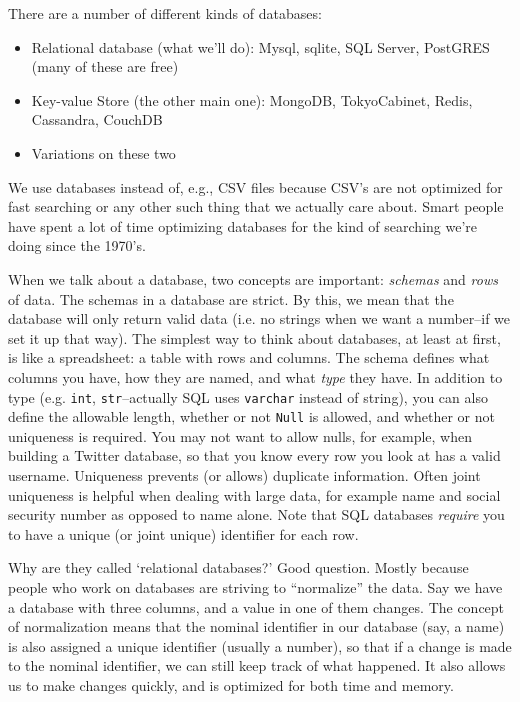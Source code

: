\documentclass[12pt,letter]{article}
\begin{document}
There are a number of different kinds of databases:
\begin{itemize}
\item Relational database (what we'll do): Mysql, sqlite, SQL Server,
  PostGRES (many of these are free) 
\item Key-value Store (the other main one): MongoDB, TokyoCabinet,
  Redis, Cassandra, CouchDB
\item Variations on these two 
\end{itemize}

We use databases instead of, e.g., CSV files because CSV's are not
optimized for fast searching or any other such thing that we
actually care about. Smart people have spent a lot of time optimizing databases
for the kind of searching we're doing since the 1970's. 

When we talk about a database, two concepts are important:
\emph{schemas} and \emph{rows} of data. The schemas in a database are
strict. By this, we mean that the database will only return valid data
(i.e. no strings when we want a number--if we set it up that way). The
simplest way to think about databases, at least at first, is like a
spreadsheet: a table with rows and columns. The schema defines what
columns you have, how they are named, and what \emph{type} they
have. In addition to type (e.g. \texttt{int}, \texttt{str}--actually
SQL uses \texttt{varchar} instead of string), you can
also define the allowable length, whether or not \texttt{Null} is
allowed, and whether or not uniqueness is required. You may not want to allow nulls, for example, when building a
Twitter database, so that you know every row you look at has a valid
username. Uniqueness prevents (or allows) duplicate information. Often
joint uniqueness is helpful when dealing with large data, for example
name and social security number as opposed to name alone. Note that
SQL databases \emph{require} you to have a unique (or joint unique)
identifier for each row. 

Why are they called `relational databases?' Good question. Mostly
because people who work on databases are striving to ``normalize'' the
data. Say we have a database with three columns, and a value in one of
them changes. The concept of normalization means that the nominal
identifier in our database (say, a name) is also assigned a unique
identifier (usually a number), so that if a change is made to the
nominal identifier, we can still keep track of what happened. It also
allows us to make changes quickly, and is optimized for both time and
memory.
\end{document}
